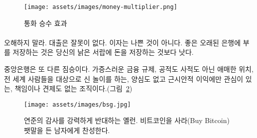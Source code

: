 \begin{comment}
	\begin{figure}
		\centering
		\texttt{[image: assets/images/money-multiplier.png]}
		\caption{The money multiplier effect}
		\label{fig:money-multiplier}
	\end{figure}
\end{comment}
\begin{figure}
	\centering
	\texttt{[image: assets/images/money-multiplier.png]}
	\caption{통화 승수 효과}
	\label{fig:money-multiplier}
\end{figure}

\paragraph{}
\begin{comment}
	Don't get me wrong: There is nothing wrong with lending. There is
	nothing wrong with interest. There isn't even anything wrong with good
	old regular banks to store your wealth somewhere more secure than in
	your sock drawer.
\end{comment}
오해하지 말라. 대출은 잘못이 없다. 
이자는 나쁜 것이 아니다. 
좋은 오래된 은행에 부를 저장하는 것은 당신의 낡은 서랍에 돈을 저장하는 것보다 낫다.

\begin{comment}
	Central banks, however, are a different beast. Abominations of financial
	regulation, half public half private, playing god with something which
	affects everyone who is part of our global civilization, without a
	conscience, only interested in the immediate future, and seemingly
	without any accountability or auditability (see Figure~\ref{fig:bsg}).
\end{comment}
중앙은행은 또 다른 짐승이다. 
가증스러운 금융 규제, 공적도 사적도 아닌 애매한 위치, 
전 세계 사람들을 대상으로 신 놀이를 하는, 양심도 없고 근시안적 이익에만 관심이 있는, 
책임이나 견제도 없는 조직이다.(그림~\ref{fig:bsg})

\begin{comment}
	\begin{figure}
		\centering
		\texttt{[image: assets/images/bsg.jpg]}
		\caption{Yellen is strongly opposed to audit the Fed, while Bitcoin Sign Guy is strongly in favor of buying bitcoin.}
		\label{fig:bsg}
	\end{figure}
\end{comment}
\begin{figure}
	\centering
	\texttt{[image: assets/images/bsg.jpg]}
	\caption{연준의 감사를 강력하게 반대하는 옐런. 비트코인을 사라(Buy Bitcoin) 팻말을 든 남자에게 찬성한다.}
	\label{fig:bsg}
\end{figure}

